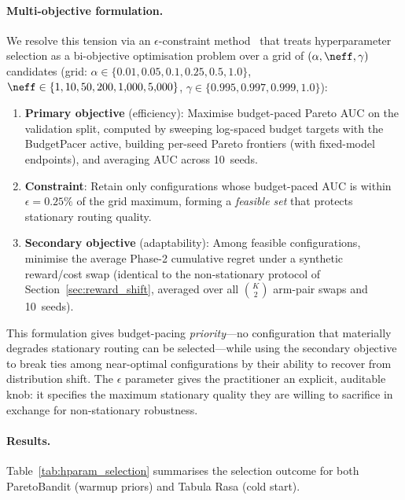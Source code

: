 \paragraph{Multi-objective formulation.}
We resolve this tension via an
$\epsilon$-constraint method~\cite{haimes1971bicriterion} that
treats hyperparameter selection as a bi-objective optimisation
problem over a grid of $(\alpha, \neff, \gamma)$ candidates
(grid: $\alpha \in \{0.01, 0.05, 0.1, 0.25, 0.5, 1.0\}$,
$\neff \in \{1, 10, 50, 200, 1{,}000, 5{,}000\}$,
$\gamma \in \{0.995, 0.997, 0.999, 1.0\}$):
%
\begin{enumerate}[nosep,leftmargin=*]
  \item \textbf{Primary objective} (efficiency):
    Maximise budget-paced Pareto AUC on the validation split, computed
    by sweeping log-spaced budget targets with the BudgetPacer
    active, building per-seed Pareto frontiers (with fixed-model
    endpoints), and averaging AUC across 10~seeds.

  \item \textbf{Constraint}:
    Retain only configurations whose budget-paced AUC is within
    $\epsilon{=}0.25\%$ of the grid maximum, forming a \emph{feasible set}
    that protects stationary routing quality.

  \item \textbf{Secondary objective} (adaptability):
    Among feasible configurations, minimise the average Phase-2
    cumulative regret under a synthetic reward/cost swap
    (identical to the non-stationary protocol of
    Section~\ref{sec:reward_shift}, averaged over all
    $\binom{K}{2}$ arm-pair swaps and 10~seeds).
\end{enumerate}
%
This formulation gives budget-pacing \emph{priority}---no
configuration that materially degrades stationary routing can be
selected---while using the secondary objective to break ties among
near-optimal configurations by their ability to recover from
distribution shift.
The $\epsilon$ parameter gives the practitioner an explicit,
auditable knob: it specifies the maximum stationary quality they are
willing to sacrifice in exchange for non-stationary robustness.

\paragraph{Results.}
Table~\ref{tab:hparam_selection} summarises the selection outcome
for both ParetoBandit (warmup priors) and Tabula Rasa (cold start).

